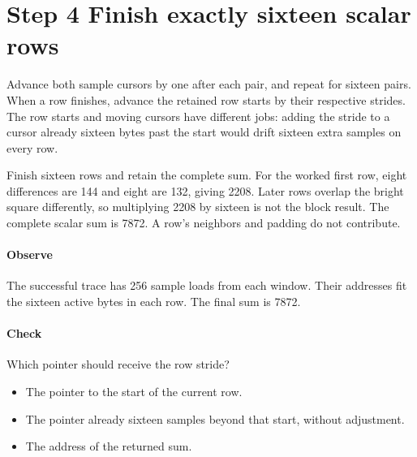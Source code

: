 \section{Step 4 Finish exactly sixteen scalar rows}\label{h263-sad-s04}
Advance both sample cursors by one after each pair, and repeat for sixteen pairs.
When a row finishes, advance the retained row starts by their respective strides.
The row starts and moving cursors have different jobs: adding the stride to a
cursor already sixteen bytes past the start would drift sixteen extra samples
on every row.

Finish sixteen rows and retain the complete sum. For the worked first row, eight
differences are 144 and eight are 132, giving 2208. Later rows overlap the bright
square differently, so multiplying 2208 by sixteen is not the block result.
The complete scalar sum is 7872. A row's neighbors and padding do not contribute.

\paragraph{Observe} The successful trace has 256 sample loads from each window.
Their addresses fit the sixteen active bytes in each row. The final sum is 7872.
\paragraph{Check} Which pointer should receive the row stride?
\begin{itemize}
  \item[A.] The pointer to the start of the current row.
  \item[B.] The pointer already sixteen samples beyond that start, without adjustment.
  \item[C.] The address of the returned sum.
\end{itemize}
